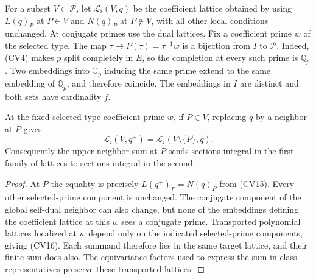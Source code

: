 For a subset $V\subset\mathcal P$, let $\mathcal L_i(V,q)$ be the
coefficient lattice obtained by using $L(q)_P$ at $P\in V$ and
$N(q)_P$ at $P\notin V$, with all other local conditions unchanged.
At conjugate primes use the dual lattices.  Fix a coefficient prime
$w$ of the selected type.  The map $\tau\mapsto P(\tau)=\tau^{-1}w$
is a bijection from $I$ to $\mathcal P$.  Indeed, (CV4) makes $p$
split completely in $E$, so the completion at every such prime is
$\mathbb Q_p$.  Two embeddings into $\mathbb C_p$ inducing the same
prime extend to the same embedding of $\mathbb Q_p$, and therefore
coincide.  The embeddings in $I$ are distinct and both sets have
cardinality $f$.

\begin{lemma}\label{cv-incidence-lattice}
At the fixed selected-type coefficient prime $w$, if $P\in V$,
replacing $q$ by a neighbor at $P$ gives
\[
             \mathcal L_i(V,q^+)=\mathcal L_i(V\setminus\{P\},q).
 \tag{CV16}
\]
Consequently the upper-neighbor sum at $P$ sends sections integral
in the first family of lattices to sections integral in the second.
\end{lemma}
\begin{proof}
At $P$ the equality is precisely $L(q^+)_P=N(q)_P$ from (CV15).
Every other selected-prime component is unchanged.  The conjugate
component of the global self-dual neighbor can also change, but none
of the embeddings defining the coefficient lattice at this $w$
sees a conjugate prime.  Transported polynomial lattices localized
at $w$ depend only on the indicated selected-prime components,
giving (CV16).
Each summand therefore lies in the same target lattice, and their
finite sum does also.  The equivariance factors used to express the
sum in class representatives preserve these transported lattices.
\end{proof}

